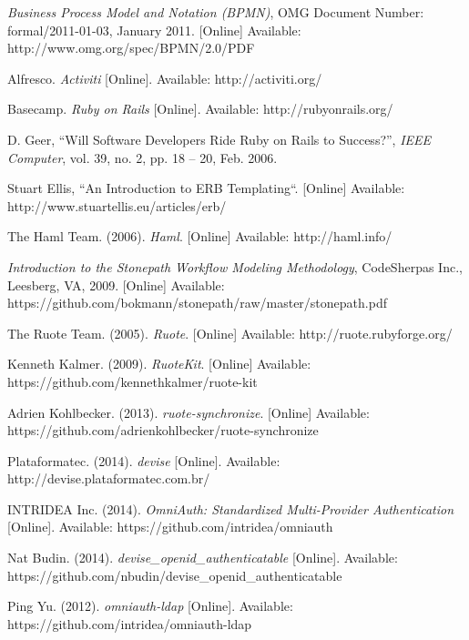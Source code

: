 \renewcommand{\bibname}{References}
\begin{thebibliography}{99}

\textit{Business Process Model and Notation
(BPMN)}, OMG Document Number: formal/2011-01-03, January 2011. [Online] Available: http://www.omg.org/spec/BPMN/2.0/PDF

Alfresco. \textit{Activiti} [Online]. Available: http://activiti.org/

Basecamp. \textit{Ruby on Rails} [Online]. Available: http://rubyonrails.org/

D. Geer, ``Will Software Developers Ride Ruby on Rails to Success?'', \textit{IEEE Computer}, vol. 39, no. 2, pp. 18 -- 20, Feb. 2006.

Stuart Ellis, ``An Introduction to ERB Templating``. [Online] Available: http://www.stuartellis.eu/articles/erb/

The Haml Team. (2006). \textit{Haml}. [Online] Available: http://haml.info/

\textit{Introduction to the Stonepath Workflow Modeling Methodology},
CodeSherpas Inc., Leesberg, VA, 2009. [Online] Available: https://github.com/bokmann/stonepath/raw/master/stonepath.pdf

The Ruote Team. (2005). \textit{Ruote}. [Online] Available: http://ruote.rubyforge.org/

Kenneth Kalmer. (2009). \textit{RuoteKit}. [Online] Available: https://github.com/kennethkalmer/ruote-kit

Adrien Kohlbecker. (2013). \textit{ruote-synchronize}. [Online] Available: https://github.com/adrienkohlbecker/ruote-synchronize

Plataformatec. (2014). \textit{devise} [Online]. Available: http://devise.plataformatec.com.br/

INTRIDEA Inc. (2014). \textit{OmniAuth: Standardized Multi-Provider Authentication} [Online]. Available: https://github.com/intridea/omniauth

Nat Budin. (2014). \textit{devise\_openid\_authenticatable} [Online]. Available: https://github.com/nbudin/devise\_openid\_authenticatable

Ping Yu. (2012). \textit{omniauth-ldap} [Online]. Available: https://github.com/intridea/omniauth-ldap


\end{thebibliography}
